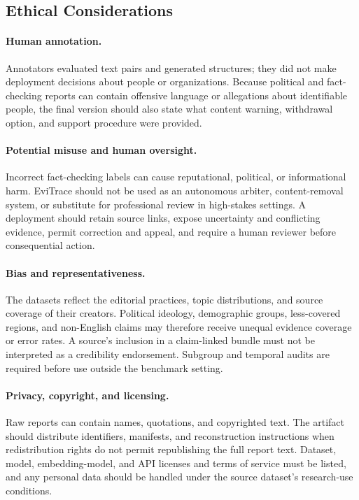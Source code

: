 \subsection{Ethical Considerations}
\label{sec:supp-ethics}

\paragraph{Human annotation.}
Annotators evaluated text pairs and generated structures; they did not
make deployment decisions about people or organizations.
Because political and fact-checking reports can contain offensive language
or allegations about identifiable people, the final version should also
state what content warning, withdrawal option, and support procedure were
provided.

\paragraph{Potential misuse and human oversight.}
Incorrect fact-checking labels can cause reputational, political, or
informational harm.  EviTrace should not be used as an autonomous arbiter,
content-removal system, or substitute for professional review in
high-stakes settings.  A deployment should retain source links, expose
uncertainty and conflicting evidence, permit correction and appeal, and
require a human reviewer before consequential action.

\paragraph{Bias and representativeness.}
The datasets reflect the editorial practices, topic distributions, and
source coverage of their creators.  Political ideology, demographic
groups, less-covered regions, and non-English claims may therefore receive
unequal evidence coverage or error rates.  A source's inclusion in a
claim-linked bundle must not be interpreted as a credibility endorsement.
Subgroup and temporal audits are required before use outside the benchmark
setting.

\paragraph{Privacy, copyright, and licensing.}
Raw reports can contain names, quotations, and copyrighted text.  The
artifact should distribute identifiers, manifests, and reconstruction
instructions when redistribution rights do not permit republishing the
full report text.  Dataset, model, embedding-model, and API licenses and
terms of service must be listed, and any personal data should be handled
under the source dataset's research-use conditions.

